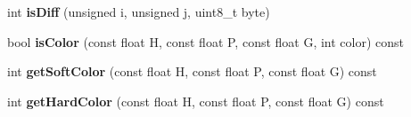 \begin{DoxyCompactItemize}
\item 
int {\bfseries is\+Diff} (unsigned i, unsigned j, uint8\+\_\+t byte)\hypertarget{structPARAMETROS__CALIBRACAO_ae8d4482b89826f4a9b2492eecb9add9e}{}\label{structPARAMETROS__CALIBRACAO_ae8d4482b89826f4a9b2492eecb9add9e}

\item 
bool {\bfseries is\+Color} (const float H, const float P, const float G, int color) const \hypertarget{structPARAMETROS__CALIBRACAO_ae66995678b366bfe37338a0e484655ab}{}\label{structPARAMETROS__CALIBRACAO_ae66995678b366bfe37338a0e484655ab}

\item 
int {\bfseries get\+Soft\+Color} (const float H, const float P, const float G) const \hypertarget{structPARAMETROS__CALIBRACAO_ae42f287a079d16bc363e7d112acc1588}{}\label{structPARAMETROS__CALIBRACAO_ae42f287a079d16bc363e7d112acc1588}

\item 
int {\bfseries get\+Hard\+Color} (const float H, const float P, const float G) const \hypertarget{structPARAMETROS__CALIBRACAO_a02b2af2d6c30a329cbd78a9893a91196}{}\label{structPARAMETROS__CALIBRACAO_a02b2af2d6c30a329cbd78a9893a91196}

\end{DoxyCompactItemize}
